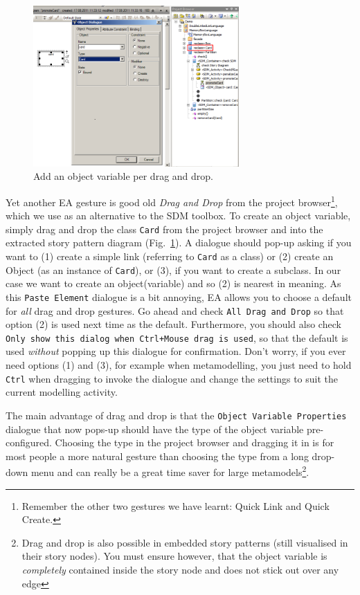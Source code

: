 \begin{figure}[htbp]
\begin{center}
  \includegraphics[width=0.7\textwidth]{pics/sdmBilder/check/sdm22RAW}
  \caption{Add an object variable per drag and drop.}  
  \label{fig:sdm_check_bound_card}
\end{center}
\end{figure}

Yet another EA gesture is good old \emph{Drag and Drop} from the project
browser\footnote{Remember the other two gestures we have learnt:  Quick Link
and Quick Create.}, which we use as an alternative to the SDM toolbox.  
To create an object variable, simply drag and drop the class
\texttt{Card} from the project browser and into the extracted story
pattern diagram (Fig.~\ref{fig:sdm_check_bound_card}).  A dialogue should pop-up
asking if you want to (1) create a simple link (referring to \texttt{Card} as a
class) or (2) create an Object (as an instance of \texttt{Card}), or (3), if you
want to create a subclass.  In our case we want to create an object(variable) 
and so (2) is nearest in meaning.  As this \texttt{Paste Element} dialogue is a
bit annoying, EA  allows you to choose a default for \emph{all} drag and drop
gestures.  Go ahead and check \texttt{All Drag and Drop} so that option (2) is
used next time as the default.  Furthermore, you should also check 
\texttt{Only show this dialog when Ctrl+Mouse drag is used}, so that the 
default is used \emph{without} popping up this dialogue for confirmation. Don't worry,
if you ever need options (1) and (3), for example when metamodelling, you  just
need to hold \texttt{Ctrl} when dragging to invoke the dialogue and change  the
settings to suit the current modelling activity. 

The main advantage of drag and drop is that the \texttt{Object Variable
Pro\-per\-ties} dialogue that now pops-up should have the type of the object
variable pre-configured. Choosing the type in the project browser and dragging it in
is for most people a more natural gesture than choosing the type from a long
drop-down menu and can really be a great time saver for large
metamodels\footnote{Drag and drop is also possible in embedded story patterns
(still visualised in their story nodes).  You must ensure however, that the
object variable is \emph{completely} contained inside the story node and does
not stick out over any edge}. 

